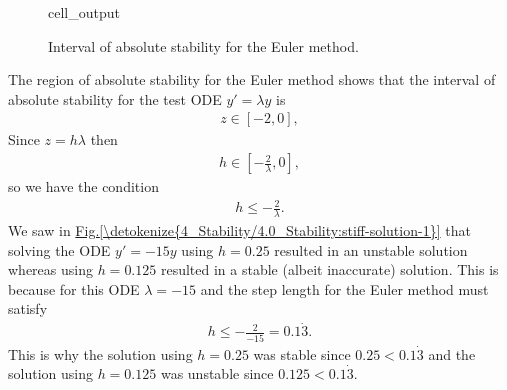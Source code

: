 \documentclass[letterpaper,10pt,english]{jupyterBook}
\begin{document}
\begin{figure}[htbp]
\centering
\capstart
\begin{sphinxVerbatimOutput}

\begin{sphinxuseclass}{cell_output}
\noindent{}

\end{sphinxuseclass}\end{sphinxVerbatimOutput}
\caption{Interval of absolute stability for the Euler method.}\label{\detokenize{4_Stability/4.1_Stability_functions:interval-of-absolute-stability-figure}}\end{figure}

\sphinxAtStartPar
The region of absolute stability for the Euler method shows that the interval of absolute stability for the test ODE \(y'=\lambda y\) is
\begin{align*}
    z \in [-2,0],
\end{align*}
\sphinxAtStartPar
Since \(z = h\lambda\) then
\begin{align*}
    h \in \left[ -\frac{2}{\lambda},0 \right],
\end{align*}
\sphinxAtStartPar
so we have the condition
\begin{align*}
    h \leq -\frac{2}{\lambda}.
\end{align*}
\sphinxAtStartPar
We saw in \hyperref[\detokenize{4_Stability/4.0_Stability:stiff-solution-1}]{Fig.\@ \ref{\detokenize{4_Stability/4.0_Stability:stiff-solution-1}}} that solving the ODE \(y' = -15y\) using \(h=0.25\) resulted in an unstable solution whereas using \(h=0.125\) resulted in a stable (albeit inaccurate) solution. This is because for this ODE \(\lambda = -15\) and the step length for the Euler method must satisfy
\begin{align*}
    h \leq -\frac{2}{-15} = 0.1\dot{3}.
\end{align*}
\sphinxAtStartPar
This is why the solution using \(h=0.25\) was stable since \(0.25 < 0.1\dot{3}\) and the solution using \(h=0.125\) was unstable since \(0.125 < 0.1\dot{3}\).

\sphinxstepscope
\end{document}
